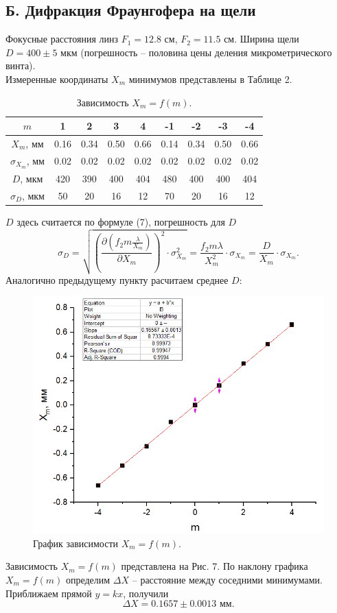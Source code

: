 \documentclass[a4paper,12pt]{article}
\begin{document}
\subsection*{Б. Дифракция Фраунгофера на щели}
Фокусные расстояния линз $F_1 = 12.8 \text{ см}$, $F_2 = 11.5 \text{ см}$. Ширина щели $D = 400 \pm 5 \text{ мкм}$ (погрешность -- половина цены деления микрометрического винта).\\
Измеренные координаты $X_m$ минимумов представлены в Таблице 2.
\newpage
\begin{table}[]
\begin{tabular}{|c|c|c|c|c|c|c|c|c|}
\hline
$m$      & 1    & 2    & 3   & 4    & -1   & -2   & -3  & -4   \\ \hline
$X_m$, мм & 0.16 & 0.34 & 0.50 & 0.66 & 0.14 & 0.34 & 0.50 & 0.66 \\ \hline
$\sigma_{X_m}$, мм & 0.02 & 0.02 & 0.02 & 0.02 & 0.02 & 0.02 & 0.02 & 0.02 \\ \hline
$D$, мкм      & 420  & 390  & 400 & 404  & 480  & 400  & 400 & 404  \\ \hline
$\sigma_D$, мкм  & 50   & 20   & 16  & 12   & 70   & 20   & 16  & 12   \\ \hline
\end{tabular}
\centering
\caption{Зависимость $X_m = f(m)$.}
\end{table}
$D$ здесь считается по формуле (7), погрешность для $D$ 
$$
\sigma_D = \sqrt{\left(\dfrac{\partial \left(f_2 m \frac{\lambda}{X_m}\right)}{\partial X_m}\right)^2 \cdot \sigma^2_{X_m}} = \dfrac{f_2m \lambda}{X_m^2} \cdot \sigma_{X_m} = \dfrac{D}{X_m} \cdot \sigma_{X_m}.
$$ 
Аналогично предыдущему пункту расчитаем среднее $D$:
\begin{center}
\end{center}
\begin{figure}[h]
\includegraphics[scale=0.7]{10.png}
\centering
\caption{График зависимости $X_m = f(m)$.}
\end{figure}
Зависимость $X_m = f(m)$ представлена на Рис. 7. По наклону графика $X_m = f(m)$ определим $\Delta X$ -- расстояние между соседними минимумами. Приближаем прямой $y = kx$, получили 
$$
\Delta X = 0.1657 \pm 0.0013 \text{ мм}.
$$ 
\end{document}
